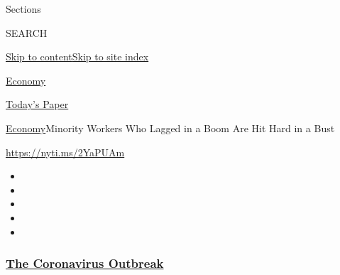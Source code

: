 Sections

SEARCH

\protect\hyperlink{site-content}{Skip to
content}\protect\hyperlink{site-index}{Skip to site index}

\href{https://www.nytimes3xbfgragh.onion/section/business/economy}{Economy}

\href{https://myaccount.nytimes3xbfgragh.onion/auth/login?response_type=cookie\&client_id=vi}{}

\href{https://www.nytimes3xbfgragh.onion/section/todayspaper}{Today's
Paper}

\href{/section/business/economy}{Economy}\textbar{}Minority Workers Who
Lagged in a Boom Are Hit Hard in a Bust

\url{https://nyti.ms/2YaPUAm}

\begin{itemize}
\item
\item
\item
\item
\item
\end{itemize}

\hypertarget{the-coronavirus-outbreak}{%
\subsubsection{\texorpdfstring{\href{https://www.nytimes3xbfgragh.onion/news-event/coronavirus?name=styln-coronavirus-markets\&region=TOP_BANNER\&variant=undefined\&block=storyline_menu_recirc\&action=click\&pgtype=Article\&impression_id=59999930-e387-11ea-90be-b975cb723b3c}{The
Coronavirus
Outbreak}}{The Coronavirus Outbreak}}\label{the-coronavirus-outbreak}}

